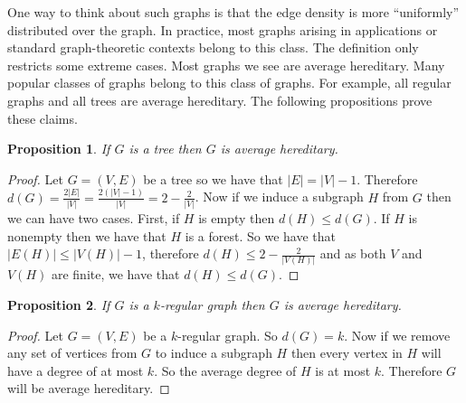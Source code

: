 \documentclass{article}
\newtheorem{proposition}{Proposition}
\begin{document}

One way to think about such graphs is that the edge density is more ``uniformly'' distributed over the graph. In practice, most graphs arising in applications or standard graph-theoretic contexts belong to this class. The definition only restricts some extreme cases. Most graphs we see are average hereditary. Many popular classes of graphs belong to this class of graphs. For example, all regular graphs and all trees are average hereditary. The following propositions prove these claims.

\begin{proposition}\label{tree}
    If $G$ is a tree then $G$ is average hereditary.     
\end{proposition}

\begin{proof}
    Let $G = (V,E)$ be a tree so we have that $|E| = |V| - 1$. Therefore $d(G) =  \frac{2|E|}{|V|} = \frac{2  (|V|-1)}{|V|} = 2 - \frac{2}{|V|}$. Now if we induce a subgraph $H$ from $G$ then we can have two cases.
    First, if $H$ is empty then $d(H) \leq d(G)$. If $H$ is nonempty then we have that $H$ is a forest. So we have that $|E(H)| \leq |V(H)| - 1$, therefore $d(H) \leq 2 - \frac{2}{|V(H)|}$ and as both $V$ and $V(H)$ are finite, we have that $d(H) \leq d(G)$. 
\end{proof}

\begin{proposition}\label{reg}
    If $G$ is a $k$-regular graph then $G$ is average hereditary.     
\end{proposition}

\begin{proof}
    Let $G = (V, E)$ be a $k$-regular graph. So $d(G) = k$.
    Now if we remove any set of vertices from $G$ to induce a subgraph $H$ then every vertex in $H$ will have a degree of at most $k$. So the average degree of $H$ is at most $k$. Therefore $G$ will be average hereditary. 
    
\end{proof}
\end{document}
